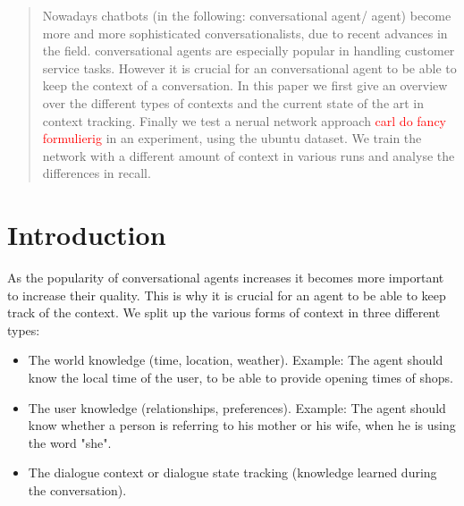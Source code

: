\documentclass[conference]{IEEEtran}
\newcommand\note[1]{\textcolor{red}{#1}}
\begin{document}
\begin{abstract}
Nowadays chatbots (in the following: conversational agent/ agent) become more and more sophisticated conversationalists, due to recent advances in the field. conversational agents are especially popular in handling customer service tasks. However it is crucial for an conversational agent to be able to keep the context of a conversation.
In this paper we first give an overview over the different types of contexts and the current state of the art in context tracking. Finally we test a nerual network approach \note{carl do fancy formulierig} in an experiment, using the ubuntu dataset\cite{lowe2015ubuntu}. We train the network with a different amount of context in various runs and analyse the differences in recall.
\end{abstract}





%
\IEEEpeerreviewmaketitle



\section{Introduction}
As the popularity of conversational agents increases it becomes more important to increase their quality. This is why it is crucial for an agent to be able to keep track of the context. We split up the various forms of context\cite{chopra2017my,williams2013dialog} in three different types: 
\begin{itemize}
\item{The world knowledge (time, location, weather). Example: The agent should know the local time of the user, to be able to provide opening times of shops.}
\item{The user knowledge (relationships, preferences). Example: The agent should know whether a person is referring to his mother or his wife, when he is using the word "she". }
\item{The dialogue context or dialogue state tracking (knowledge learned during the conversation).}
\end{itemize}
\end{document}
